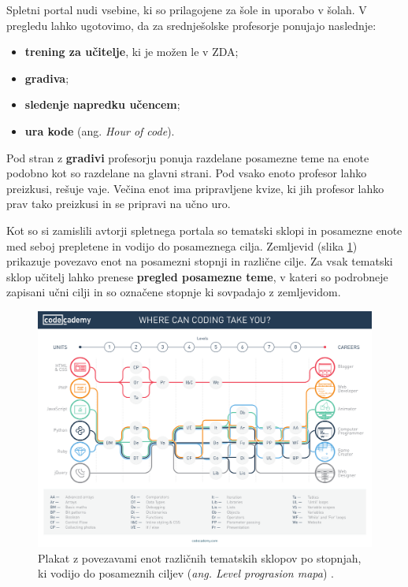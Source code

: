 Spletni portal nudi vsebine, ki so prilagojene za šole in uporabo v
šolah. V pregledu lahko ugotovimo, da za srednješolske profesorje
ponujajo naslednje:

\begin{itemize}
\item \textbf{trening za učitelje}, ki je možen le v ZDA;
\item \textbf{gradiva};
\item \textbf{sledenje napredku učencem};
\item \textbf{ura kode} (ang. \emph{Hour of code}).
\end{itemize}

Pod stran z \textbf{ gradivi} %
profesorju ponuja razdelane posamezne teme na enote podobno kot so
razdelane na glavni strani. Pod vsako enoto profesor lahko preizkusi,
rešuje vaje. Večina enot ima pripravljene kvize, ki jih profesor lahko
prav tako preizkusi in se pripravi na učno uro.


Kot so si zamislili avtorji spletnega portala so tematski sklopi in
posamezne enote med seboj prepletene in vodijo do posameznega
cilja. Zemljevid (slika \ref{fig:codeacademy:poster}) prikazuje
povezavo enot na posamezni stopnji in različne cilje. Za vsak tematski
sklop učitelj lahko prenese \textbf{pregled posamezne teme}, v kateri
so podrobneje zapisani učni cilji in so označene stopnje ki sovpadajo
z zemljevidom.

\begin{figure}[h!]
  \centering
    \includegraphics [width=1\linewidth, keepaspectratio =
   1] {./images/CAdemy-poster.pdf}
   \caption{Plakat z povezavami enot različnih tematskih sklopov po
     stopnjah, ki vodijo  do posameznih ciljev (\emph{ang. Level
       prograsion mapa}) \cite{web:codeacademy}.}
    \label{fig:codeacademy:poster}
\end{figure}

